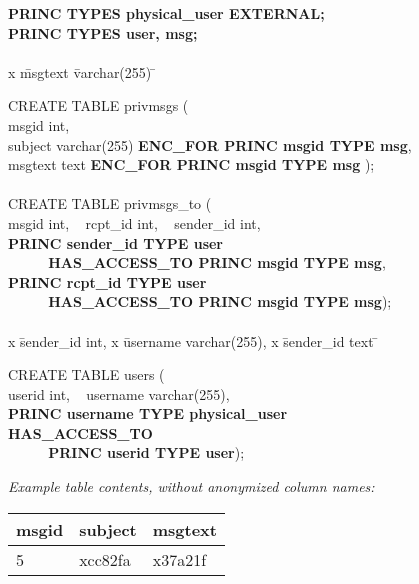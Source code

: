 \renewcommand{\FrameSep}{0.05in}
\begin{figure}[t!]
\begin{framed}
\footnotesize

\begin{tabbing}
{\bf PRINC TYPES physical\_user EXTERNAL;} \\
{\bf PRINC TYPES user, msg;} \\
\\

x \= msgtext \= varchar(255) \= \kill

CREATE TABLE privmsgs (\\
\> msgid \> int, \\
\> subject \> varchar(255) \> {\bf ENC\_FOR PRINC msgid TYPE msg}, \\
\> msgtext \> text \> {\bf ENC\_FOR PRINC msgid TYPE msg} ); \\
\\

CREATE TABLE privmsgs\_to (\\
\> msgid int, ~ rcpt\_id int, ~ sender\_id int, \\

\> {\bf PRINC sender\_id TYPE user} \\
\> {\bf ~ ~ ~ HAS\_ACCESS\_TO PRINC msgid TYPE msg}, \\
\> {\bf PRINC rcpt\_id TYPE user} \\
\> {\bf ~ ~ ~ HAS\_ACCESS\_TO PRINC msgid TYPE msg}); \\
\\

x \= sender\_id  int, x \= username varchar(255), x \= sender\_id text \= \kill

CREATE TABLE users (\\
 \> userid int, ~ username varchar(255), \\

\> {\bf PRINC username TYPE physical\_user HAS\_ACCESS\_TO} \\
\> {\bf ~ ~ ~ PRINC userid TYPE user}); 

\end{tabbing}

\vspace{-4mm}
\hrulefill
\vspace{-2mm}

\begin{center}
\textit{Example table contents, without anonymized column names:}
\end{center}
 \hspace{1mm}
 \begin{minipage}[h]{1.7 in}
  \centering
  \begin{tabular}{p{0.8cm}|p{1cm}|p{0.8cm}}
  msgid & subject & msgtext \\ \hline
  5 & xcc82fa & x37a21f \\ 
  \end{tabular}


\end{minipage}
\end{framed}
\end{figure}
